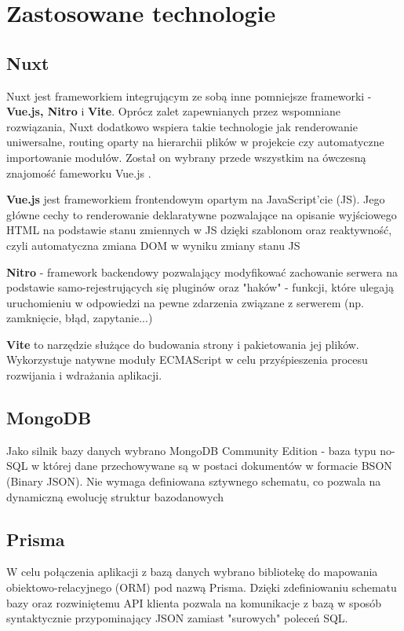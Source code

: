 \section{Zastosowane technologie}

\subsection{Nuxt}
Nuxt jest frameworkiem integrującym ze sobą inne pomniejsze frameworki - \textbf{Vue.js, Nitro} i \textbf{Vite}. 
Oprócz zalet zapewnianych przez wspomniane rozwiązania, Nuxt dodatkowo wspiera takie technologie jak 
renderowanie uniwersalne, routing oparty na hierarchii plików w projekcie czy automatyczne importowanie modułów.
Został on wybrany przede wszystkim na ówczesną znajomość fameworku Vue.js \cite{nuxt-js}.

\textbf{Vue.js} jest frameworkiem frontendowym opartym na JavaScript'cie (JS). Jego główne cechy to renderowanie deklaratywne
pozwalające na opisanie wyjściowego HTML na podstawie stanu zmiennych w JS dzięki szablonom oraz reaktywność, czyli
automatyczna zmiana DOM w wyniku zmiany stanu JS \cite{vue-js}

\textbf{Nitro} - framework backendowy pozwalający modyfikować zachowanie serwera na podstawie samo-rejestrujących się
pluginów oraz "haków" - funkcji, które ulegają uruchomieniu w odpowiedzi na pewne zdarzenia związane z serwerem
(np. zamknięcie, błąd, zapytanie...) \cite{nitro-js}

\textbf{Vite} to narzędzie służące do budowania strony i pakietowania jej plików. Wykorzystuje natywne moduły ECMAScript
w celu przyśpieszenia procesu rozwijania i wdrażania aplikacji. \cite{vite-js}


\subsection{MongoDB}
Jako silnik bazy danych wybrano MongoDB Community Edition - baza typu no-SQL w której dane przechowywane są w postaci
dokumentów w formacie BSON (Binary JSON). Nie wymaga definiowana sztywnego schematu, co pozwala na dynamiczną ewolucję
struktur bazodanowych \cite{mongo-db}

\subsection{Prisma}
W celu połączenia aplikacji z bazą danych wybrano bibliotekę do mapowania obiektowo-relacyjnego (ORM) pod nazwą Prisma.
Dzięki zdefiniowaniu schematu bazy oraz rozwiniętemu API klienta pozwala na komunikacje z bazą w sposób syntaktycznie 
przypominający JSON zamiast "surowych" poleceń SQL. \cite{prisma-io}

